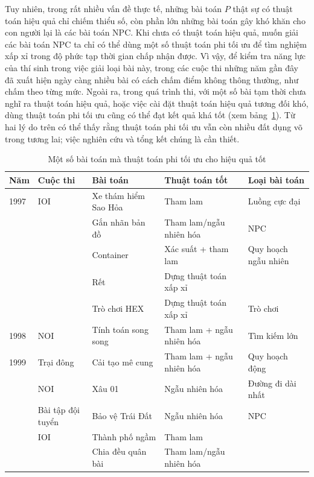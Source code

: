 \documentclass[11pt]{article}
\begin{document}
Tuy nhiên, trong rất nhiều vấn đề thực tế, những bài toán \(P\) thật sự có
thuật toán hiệu quả chỉ chiếm thiểu số, còn phần lớn những bài toán gây khó
khăn cho con người lại là các bài toán NPC. Khi chưa có thuật toán hiệu quả,
muốn giải các bài toán NPC ta chỉ có thể dùng một số thuật toán phi tối ưu để
tìm nghiệm xấp xỉ trong độ phức tạp thời gian chấp nhận được. Vì vậy, để kiểm
tra năng lực của thí sinh trong việc giải loại bài này, trong các cuộc thi
những năm gần đây đã xuất hiện ngày càng nhiều bài có cách chấm điểm không
thông thường, như chấm theo từng mức. Ngoài ra, trong quá trình thi, với một
số bài tạm thời chưa nghĩ ra thuật toán hiệu quả, hoặc việc cài đặt thuật toán
hiệu quả tương đối khó, dùng thuật toán phi tối ưu cũng có thể đạt kết quả
khá tốt (xem bảng~\ref{tab:applications}). Từ hai lý do trên có thể thấy rằng
thuật toán phi tối ưu vẫn còn nhiều đất dụng võ trong tương lai; việc nghiên
cứu và tổng kết chúng là cần thiết.

\begin{table}[htbp]
\centering
\scriptsize
\begin{tabular}{lllll}
\hline
Năm & Cuộc thi & Bài toán & Thuật toán tốt & Loại bài toán\\
\hline
1997 & IOI & Xe thám hiểm Sao Hỏa & Tham lam & Luồng cực đại\\
     &     & Gắn nhãn bản đồ & Tham lam/ngẫu nhiên hóa & NPC\\
     &     & Container & Xác suất + tham lam & Quy hoạch ngẫu nhiên\\
     &     & Rết & Dựng thuật toán xấp xỉ & \\
     &     & Trò chơi HEX & Dựng thuật toán xấp xỉ & Trò chơi\\
1998 & NOI & Tính toán song song & Tham lam + ngẫu nhiên hóa & Tìm kiếm lớn\\
1999 & Trại đông & Cải tạo mê cung & Tham lam + ngẫu nhiên hóa & Quy hoạch động\\
     & NOI & Xâu 01 & Ngẫu nhiên hóa & Đường đi dài nhất\\
     & Bài tập đội tuyển & Bảo vệ Trái Đất & Ngẫu nhiên hóa & NPC\\
     & IOI & Thành phố ngầm & Tham lam & \\
     &     & Chia đều quân bài & Tham lam/ngẫu nhiên hóa & \\
\hline
\end{tabular}
\caption{Một số bài toán mà thuật toán phi tối ưu cho hiệu quả tốt}
\label{tab:applications}
\end{table}
\end{document}
